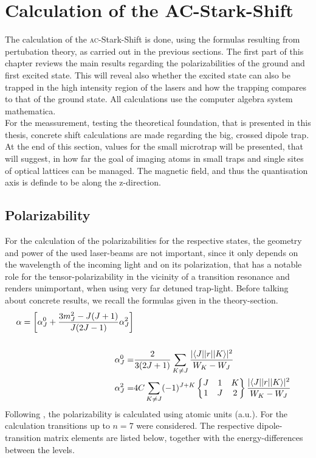 \chapter{Calculation of the AC-Stark-Shift}

The calculation of the \textsc{ac}-Stark-Shift is done, using the formulas resulting from pertubation theory, as carried out in the previous sections. The first part of this chapter reviews the main results regarding the polarizabilities of the ground and first excited state. This will reveal also whether the excited state can also be trapped in the high intensity region of the lasers and how the trapping compares to that of the ground state. All calculations use the computer algebra system mathematica.\\For the meassurement, testing the theoretical foundation, that is presented in this thesis, concrete shift calculations are made regarding the big, crossed dipole trap. At the end of this section, values for the small microtrap will be presented, that will suggest, in how far the goal of imaging atoms in small traps and single sites of optical lattices can be managed. The magnetic field, and thus the quantisation axis is definde to be along the z-direction.

\section{Polarizability}
For the calculation of the polarizabilities for the respective states, the geometry and power of the used laser-beams are not important, since it only depends on the wavelength of the incoming light and on its polarization, that has a notable role for the tensor-polarizability in the vicinity of a transition resonance and renders unimportant, when using very far detuned trap-light. Before talking about concrete results, we recall the formulas given in the theory-section. 
\begin{align}
\alpha=\left[\alpha^0_J+\frac{3m^2_J-J(J+1)}{J(2J-1)}\alpha^2_J\right]\\
\notag\\
\alpha^0_J=&\frac{2}{3(2J+1)}\sum_{K\neq J}\frac{|\langle J| |r| | K\rangle|^2}{W_K-W_J}\notag\\
\alpha^2_J=&4C\sum_{K\neq J}(-1)^{J+K}\begin{Bmatrix}J&1&K\\1&J&2\end{Bmatrix}\frac{|\langle J| |r| | K\rangle|^2}{W_K-W_J}\notag
\end{align}
Following \cite{magic}, the polarizability is calculated using atomic units (a.u.). For the calculation transitions up to $n=7$ were considered. The respective dipole-transition matrix elements are listed below, together with the energy-differences between the levels.

